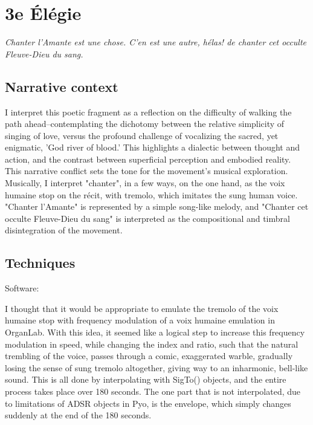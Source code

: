\documentclass[12pt,twoside,maitrise]{dms_ks}
\theoremstyle{definition}
\begin{document}
\section{3e Élégie}

\epigraph{\textit{Chanter l'Amante est une chose. C'en est une autre, hélas! de chanter cet occulte Fleuve-Dieu du sang.}}{}

\subsection{Narrative context}

I interpret this poetic fragment as a reflection on the difficulty of walking the path ahead--contemplating the dichotomy between the relative simplicity of singing of love, versus the profound challenge of vocalizing the sacred, yet enigmatic, 'God river of blood.' 
This highlights a dialectic between thought and action, and the contrast between superficial perception and embodied reality.
This narrative conflict sets the tone for the movement's musical exploration.
Musically, I interpret "chanter", in a few ways, on the one hand, as the voix humaine stop on the récit, with tremolo, which imitates the sung human voice.
"Chanter l'Amante" is represented by a simple song-like melody, and "Chanter cet occulte Fleuve-Dieu du sang" is interpreted as the compositional and timbral disintegration of the movement.

\subsection{Techniques}

Software:

I thought that it would be appropriate to emulate the tremolo of the voix humaine stop with frequency modulation of a voix humaine emulation in OrganLab.
With this idea, it seemed like a logical step to increase this frequency modulation in speed, while changing the index and ratio, such that the natural trembling of the voice, passes through a comic, exaggerated warble, gradually losing the sense of sung tremolo altogether, giving way to an inharmonic, bell-like sound.
This is all done by interpolating with SigTo() objects, and the entire process takes place over 180 seconds.
The one part that is not interpolated, due to limitations of ADSR objects in Pyo, is the envelope, which simply changes suddenly at the end of the 180 seconds.
\end{document}
